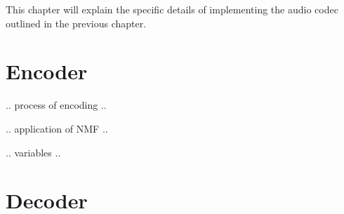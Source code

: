 This chapter will explain the specific details of implementing the audio codec outlined in the previous chapter.

\section{Encoder}
.. process of encoding ..

.. application of NMF ..

.. variables ..

\section{Decoder}